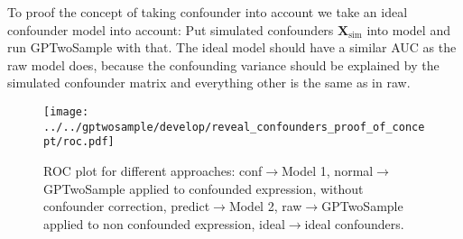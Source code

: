 \documentclass[a4paper,tablecaptionabove]{article}
\newcommand{\matr}[1]{\ensuremath{\boldsymbol{\mathbf #1}}}
\begin{document}
To proof the concept of taking confounder into account we take an
ideal confounder model into account: Put simulated confounders $\matr
X_\text{sim}$ into model and run GPTwoSample with that. The ideal
model should have a similar AUC as the raw model does, because the
confounding variance should be explained by the simulated confounder
matrix and everything other is the same as in raw.

\begin{figure}[h]
  \centering
  \texttt{[image: ../../gptwosample/develop/reveal\_confounders\_proof\_of\_concept/roc.pdf]}
  \caption{ROC plot for different approaches: conf$\rightarrow$Model
    1, normal$\rightarrow$GPTwoSample applied to confounded
    expression, without confounder correction,
    predict$\rightarrow$Model 2, raw$\rightarrow$GPTwoSample applied
    to non confounded expression, ideal$\rightarrow$ideal
    confounders.}
\end{figure}

\end{document}
